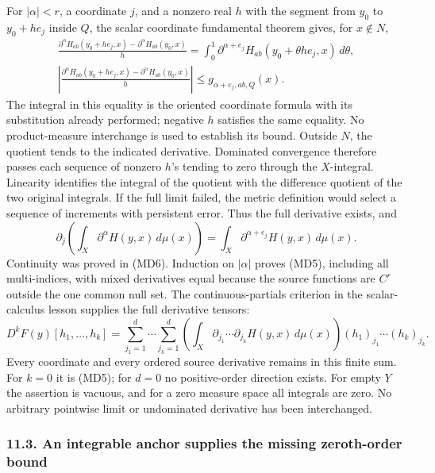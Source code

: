 \documentclass[
  11pt,
]{article}
\begin{document}
For \(|\alpha|<r\), a coordinate \(j\), and a nonzero real \(h\) with
the segment from \(y_0\) to \(y_0+he_j\) inside \(Q\), the scalar
coordinate fundamental theorem gives, for \(x\notin N\), \[
\begin{gathered}
\frac{\partial^\alpha H_{ab}(y_0+he_j,x)-\partial^\alpha H_{ab}(y_0,x)}{h}
=\int_0^1\partial^{\alpha+e_j}H_{ab}(y_0+\theta he_j,x)\,d\theta ,\\
\left|\frac{\partial^\alpha H_{ab}(y_0+he_j,x)-\partial^\alpha H_{ab}(y_0,x)}{h}\right|
\leq g_{\alpha+e_j,ab,Q}(x).
\end{gathered}
\tag{MD7}
\] The integral in this equality is the oriented coordinate formula with
its substitution already performed; negative \(h\) satisfies the same
equality. No product-measure interchange is used to establish its bound.
Outside \(N\), the quotient tends to the indicated derivative. Dominated
convergence therefore passes each sequence of nonzero \(h\)'s tending to
zero through the \(X\)-integral. Linearity identifies the integral of
the quotient with the difference quotient of the two original integrals.
If the full limit failed, the metric definition would select a sequence
of increments with persistent error. Thus the full derivative exists,
and \[
 \partial_j\left(\int_X\partial^\alpha H(y,x)\,d\mu(x)\right)
          =\int_X\partial^{\alpha+e_j}H(y,x)\,d\mu(x).
\tag{MD8}
\] Continuity was proved in (MD6). Induction on \(|\alpha|\) proves
(MD5), including all multi-indices, with mixed derivatives equal because
the source functions are \(C^r\) outside the one common null set. The
continuous-partials criterion in the scalar-calculus lesson supplies the
full derivative tensors: \[
 D^kF(y)[h_1,\ldots,h_k]
   =\sum_{j_1=1}^d\cdots\sum_{j_k=1}^d
       \left(\int_X
          \partial_{j_1}\cdots\partial_{j_k}H(y,x)\,d\mu(x)\right)
                    (h_1)_{j_1}\cdots(h_k)_{j_k}.
\tag{MD9}
\] Every coordinate and every ordered source derivative remains in this
finite sum. For \(k=0\) it is (MD5); for \(d=0\) no positive-order
direction exists. For empty \(Y\) the assertion is vacuous, and for a
zero measure space all integrals are zero. No arbitrary pointwise limit
or undominated derivative has been interchanged.

\subsubsection{11.3. An integrable anchor supplies the missing
zeroth-order
bound}\label{an-integrable-anchor-supplies-the-missing-zeroth-order-bound}
\end{document}
